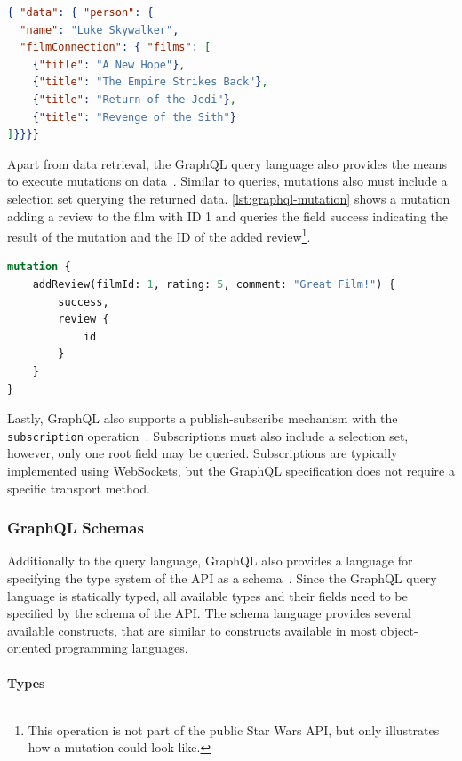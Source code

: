 \begin{lstlisting}[language=json, caption={SWAPI GraphQL Response}, label={lst:graphql-response}]
{ "data": { "person": {
  "name": "Luke Skywalker",
  "filmConnection": { "films": [
    {"title": "A New Hope"},
    {"title": "The Empire Strikes Back"},
    {"title": "Return of the Jedi"},
    {"title": "Revenge of the Sith"}
]}}}}
\end{lstlisting}

Apart from data retrieval, the GraphQL query language also provides the means to execute mutations on data~\cite{Facebook2018}.
Similar to queries, mutations also must include a selection set querying the returned data.
\autoref{lst:graphql-mutation} shows a mutation adding a review to the film with ID 1 and queries the field success indicating the result of the mutation and the ID of the added review\footnote{This operation is not part of the public Star Wars \ac{API}, but only illustrates how a mutation could look like.}.

\begin{lstlisting}[language=graphql, caption={GraphQL Mutations}, label={lst:graphql-mutation}]
mutation {
    addReview(filmId: 1, rating: 5, comment: "Great Film!") {
        success,
        review {
            id
        }
    }
}    
\end{lstlisting}

Lastly, GraphQL also supports a publish-subscribe mechanism with the \texttt{subscription} operation~\cite{Facebook2018}.
Subscriptions must also include a selection set, however, only one root field may be queried.
Subscriptions are typically implemented using WebSockets, but the GraphQL specification does not require a specific transport method.

\subsubsection{GraphQL Schemas}\label{sec:graphql-schemas}

Additionally to the query language, GraphQL also provides a language for specifying the type system of the \ac{API} as a schema~\cite{Diaz2020}.
Since the GraphQL query language is statically typed, all available types and their fields need to be specified by the schema of the \ac{API}.
The schema language provides several available constructs, that are similar to constructs available in most object-oriented programming languages.

\paragraph{Types}

